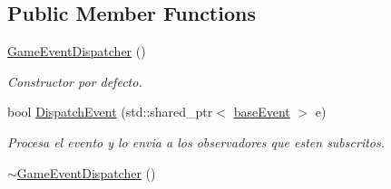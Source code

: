 \subsection*{Public Member Functions}
\begin{DoxyCompactItemize}
\item 
\hyperlink{classant_1_1_game_event_dispatcher_a5240dcf9c2048e9ac70ddf7a3d938c2f}{Game\+Event\+Dispatcher} ()
\begin{DoxyCompactList}\small\item\em Constructor por defecto. \end{DoxyCompactList}\item 
bool \hyperlink{classant_1_1_game_event_dispatcher_a63b9ec91ca5a593b7217a5e74e984459}{Dispatch\+Event} (std\+::shared\+\_\+ptr$<$ \hyperlink{classant_1_1base_event}{base\+Event} $>$ e)
\begin{DoxyCompactList}\small\item\em Procesa el evento y lo envia a los observadores que esten subscritos. \end{DoxyCompactList}\item 
\hyperlink{classant_1_1_game_event_dispatcher_a7ebe7e59248718a0bd7e2d3c5daa5828}{$\sim$\+Game\+Event\+Dispatcher} ()
\end{DoxyCompactItemize}
